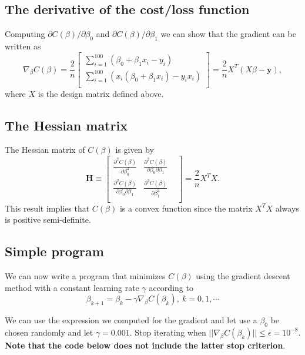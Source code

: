\documentclass[%
oneside,                 %
final,                   %
10pt]{article}
\begin{document}
\subsection{The derivative of the cost/loss function}

Computing $\partial C(\beta) / \partial \beta_0$ and $\partial C(\beta) / \partial \beta_1$ we can show  that the gradient can be written as
\[
\nabla_{\beta} C(\beta) = \frac{2}{n}\begin{bmatrix} \sum_{i=1}^{100} \left(\beta_0+\beta_1x_i-y_i\right) \\
\sum_{i=1}^{100}\left( x_i (\beta_0+\beta_1x_i)-y_ix_i\right) \\
\end{bmatrix} = \frac{2}{n}X^T(X\beta - \mathbf{y}), 
\]
where $X$ is the design matrix defined above.

\subsection{The Hessian matrix}
The Hessian matrix of $C(\beta)$ is given by 
\[
\bm{H} \equiv \begin{bmatrix}
\frac{\partial^2 C(\beta)}{\partial \beta_0^2} & \frac{\partial^2 C(\beta)}{\partial \beta_0 \partial \beta_1}  \\
\frac{\partial^2 C(\beta)}{\partial \beta_0 \partial \beta_1} & \frac{\partial^2 C(\beta)}{\partial \beta_1^2} &  \\
\end{bmatrix} = \frac{2}{n}X^T X.
\]
This result implies that $C(\beta)$ is a convex function since the matrix $X^T X$ always is positive semi-definite.




\subsection{Simple program}

We can now write a program that minimizes $C(\beta)$ using the gradient descent method with a constant learning rate $\gamma$ according to 
\[
\beta_{k+1} = \beta_k - \gamma \nabla_\beta C(\beta_k), \ k=0,1,\cdots 
\]

We can use the expression we computed for the gradient and let use a
$\beta_0$ be chosen randomly and let $\gamma = 0.001$. Stop iterating
when $||\nabla_\beta C(\beta_k) || \leq \epsilon = 10^{-8}$. \textbf{Note that the code below does not include the latter stop criterion}.
\end{document}

